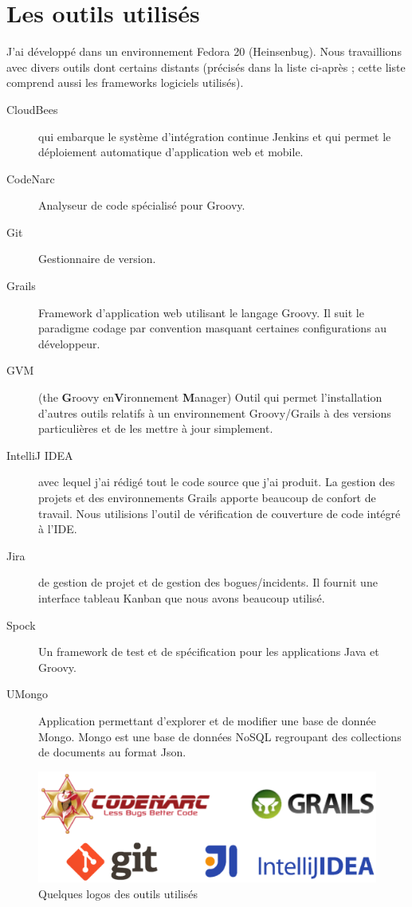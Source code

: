 \section{Les outils utilisés}
J'ai développé dans un environnement Fedora 20 (Heinsenbug).
Nous travaillions avec divers outils dont certains distants (précisés dans la
liste ci-après ; cette liste comprend aussi les frameworks logiciels utilisés).
\begin{description}
  \item[CloudBees]  qui embarque le système d'intégration continue
	Jenkins et qui permet le déploiement automatique d'application web et
	mobile.
  \item[CodeNarc] Analyseur de code spécialisé pour Groovy.
  \item[Git] Gestionnaire de version.
  \item[Grails] Framework d'application web utilisant le langage Groovy. Il suit
	le paradigme \og codage par convention \fg{} masquant certaines
	configurations au développeur.
  \item[GVM] (the {\bf G}roovy en{\bf V}ironnement {\bf M}anager) Outil qui
	permet l'installation d'autres outils relatifs à un environnement
	Groovy/Grails à des versions particulières et de les mettre à jour
	simplement.
  \item[IntelliJ IDEA]  avec lequel j'ai rédigé tout le code source
	que j'ai produit. La gestion des projets et des environnements Grails
	apporte beaucoup de confort de travail. Nous utilisions l'outil de
	vérification de couverture de code intégré à l'IDE.
  \item[Jira]  de gestion de projet et de gestion des bogues/incidents. Il
	fournit une interface \og tableau Kanban \fg{} que nous avons beaucoup utilisé.
  \item[Spock] Un framework de test et de spécification pour les applications
	Java et Groovy.
  \item[UMongo] Application permettant d'explorer et de modifier une base de
	donnée Mongo. Mongo est une base de données NoSQL regroupant des collections
	de documents au format Json.
\end{description}

\begin{figure}[h]
  \centering
  \includegraphics[width=15cm]{images/logos}
  \caption{Quelques logos des outils utilisés}
  \label{fig:logos}
\end{figure}
